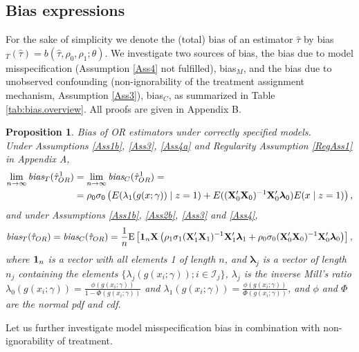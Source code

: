 \documentclass[11pt]{article}
\newtheorem{prop}{Proposition}
\newcommand{\E}{{\mbox{E}}}
\newcommand{\X}{{\bf X}}
\newcommand{\limes}{\lim \limits_{n\to\infty}}
\begin{document}
\subsection{Bias expressions}
\label{Bias.section}

For the sake of simplicity we denote the (total) bias of an estimator $\hat \tau$ by bias$_T(\hat \tau)=b(\hat \tau, \rho_0,\rho_1;\theta)$. We investigate two sources of bias, the bias due to model misspecification (Assumption \ref{Ass4} not fulfilled), bias$_M$, and the bias due to unobserved confounding (non-ignorability of the treatment assignment mechanism, Assumption \ref{Ass3}), bias$_C$, as summarized in Table \ref{tab:bias.overview}. All proofs are given in  Appendix B.


\begin{prop} \emph{Bias of OR estimators under correctly specified models.}\\ %
Under Assumptions \ref{Ass1b}, \ref{Ass3}, \ref{Ass4a} and Regularity Assumption \ref{RegAss1} in Appendix A,
	\begin{align*}
	\limes \emph{bias}_T (\hat \tau_{OR}^1)&=\limes\emph{bias}_C (\hat \tau_{OR}^1) =\\
	&=\rho_0\sigma_0 \left(E(\lambda_1(g(x; \gamma))\mid z=1)+ E((\X_0'\X_0)^{-1}\X_0' \boldsymbol \lambda_0) E(x\mid z=1)\right),
	\end{align*}
 and under Assumptions \ref{Ass1b}, \ref{Ass2b}, \ref{Ass3} and \ref{Ass4},%
		\begin{align*}
 \emph{bias}_T (\hat \tau_{OR})= \emph{bias}_C (\hat \tau_{OR})= \frac{1}{n}\E\left[ {\bf1}_n \X  \left(\rho_1\sigma_1(\X_1'\X_1)^{-1}\X_1' \boldsymbol\lambda_1 +\rho_0\sigma_0(\X_0'\X_0)^{-1}\X_0' \boldsymbol 	\lambda_0 \right)\right],
 \end{align*}
where ${\bf1}_n$ is a vector with all elements 1 of length $n$, and $\boldsymbol \lambda_j$ is a vector of length $n_j$ containing the elements $\{\lambda_j(g(x_i; \gamma)) ; i \in \mathcal{I}_j\} $, $\lambda_j$ is the inverse Mill's ratio $\lambda_0(g(x_i; \gamma))=\frac{\phi(g(x_i; \gamma))}{1-\Phi(g(x_i; \gamma))}$ and $\lambda_1(g(x_i; \gamma))=\frac{\phi(g(x_i; \gamma))}{\Phi(g(x_i; \gamma))}$,  and $\phi$ and $\Phi$ are the normal pdf and cdf. 
\label{Prop.OR1}
\end{prop}
\noindent Let us further investigate model misspecification bias in combination with non-ignorability of treatment. 
\end{document}
